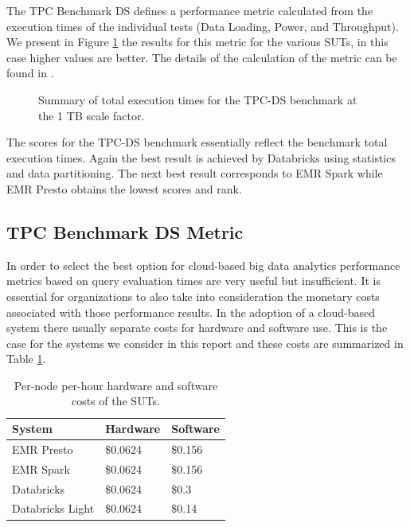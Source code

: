 The TPC Benchmark DS defines a performance metric calculated from the execution times of the individual tests (Data Loading, Power, and Throughput). We present in Figure \ref{fig:tpcdsMetricSummary} the results for this metric for the various SUTs, in this case higher values are better. The details of the calculation of the metric can be found in \cite{tpcdsSpec}.

\begin{figure}
   \begin{center}
   \end{center}
   \caption{Summary of total execution times for the TPC-DS benchmark at the 1 TB scale factor.}
   \label{fig:tpcdsMetricSummary}
\end{figure}

The scores for the TPC-DS benchmark essentially reflect the benchmark total execution times. Again the best result is achieved by Databricks using statistics and data partitioning. The next best result corresponds to EMR Spark while EMR Presto obtains the lowest scores and rank.

\subsection{TPC Benchmark DS Metric}\label{summaryTpcdsMetric}

In order to select the best option for cloud-based big data analytics performance metrics based on query evaluation times are very useful but insufficient. It is essential for organizations to also take into consideration the monetary costs associated with those performance results. In the adoption of a cloud-based system there usually separate costs for hardware and software use. This is the case for the systems we consider in this report and these costs are summarized in Table \ref{table:systemCosts}.

\begin{table}
  \centering
	\begin{tabular}{|l|l|l|}
	  \hline
		\textbf{System} & \textbf{Hardware} & \textbf{Software} \\ \hline
		EMR Presto & \$0.0624 & \$0.156 \\ \hline
		EMR Spark & \$0.0624 & \$0.156 \\ \hline
		Databricks & \$0.0624 & \$0.3 \\ \hline 
		Databricks Light & \$0.0624 & \$0.14 \\ \hline 
	\end{tabular}
	\caption{Per-node per-hour hardware and software costs of the SUTs.}
	\label{table:systemCosts}
\end{table}


